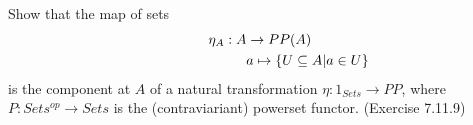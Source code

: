 Show that the map of sets
\begin{gather*}
    \eta_A: A \to PP(A) \\
    \hspace{2.4cm} a \mapsto \{U \subseteq A | a \in U\}
\end{gather*}
is the component at $A$ of a natural transformation $\eta: 1_{Sets} \to PP$, where \\$P: Sets^{op} \to Sets$ is the (contraviariant) powerset functor. (Exercise 7.11.9)